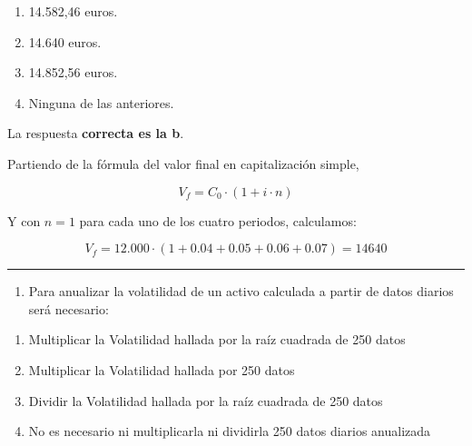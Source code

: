 \documentclass[
  letterpaper,
  DIV=11,
  numbers=noendperiod]{scrreprt}
\providecommand{\tightlist}{%
  \setlength{\itemsep}{0pt}\setlength{\parskip}{0pt}}\usepackage{longtable,booktabs,array}
\begin{document}
\begin{enumerate}
\def\labelenumi{\alph{enumi}.}
\item
  14.582,46 euros.
\item
  14.640 euros.
\item
  14.852,56 euros.
\item
  Ninguna de las anteriores.
\end{enumerate}

\begin{tcolorbox}[enhanced jigsaw, left=2mm, opacityback=0, colback=white, breakable, arc=.35mm, bottomrule=.15mm, rightrule=.15mm, toprule=.15mm, leftrule=.75mm, colframe=quarto-callout-tip-color-frame]
\begin{minipage}[t]{5.5mm}
\textcolor{quarto-callout-tip-color}{\faLightbulb}
\end{minipage}%
\begin{minipage}[t]{\textwidth - 5.5mm}

La respuesta \textbf{correcta es la b}.

Partiendo de la fórmula del valor final en capitalización simple,

\[V_f=C_0\cdot\left(1+i\cdot n\right)\]

Y con \(n=1\) para cada uno de los cuatro periodos, calculamos:

\[V_f=12.000\cdot\left(1+0.04+0.05+0.06+0.07\right)=14640\]

\end{minipage}%
\end{tcolorbox}

\begin{center}\rule{0.5\linewidth}{0.5pt}\end{center}

\begin{enumerate}
\def\labelenumi{\arabic{enumi}.}
\setcounter{enumi}{100}
\tightlist
\item
  Para anualizar la volatilidad de un activo calculada a partir de datos
  diarios será necesario:
\end{enumerate}

\begin{enumerate}
\def\labelenumi{\alph{enumi})}
\item
  Multiplicar la Volatilidad hallada por la raíz cuadrada de 250 datos
\item
  Multiplicar la Volatilidad hallada por 250 datos
\item
  Dividir la Volatilidad hallada por la raíz cuadrada de 250 datos
\item
  No es necesario ni multiplicarla ni dividirla 250 datos diarios
  anualizada
\end{enumerate}
\end{document}
